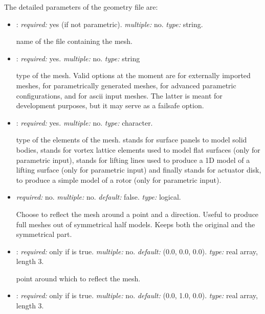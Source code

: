 The detailed parameters of the geometry file are:
\begin{itemize}
\item {}: \textit{required:} yes (if not parametric). \textit{multiple:} no. \textit{type:} string. 

name of the file containing the mesh.

\item {}: \textit{required:} yes. \textit{multiple:} no. \textit{type:} string

type of the mesh. Valid options at the moment are  for externally imported meshes,  
for parametrically generated meshes,  for advanced parametric configurations, and  for ascii input meshes. 
The latter is meant for development purposes, but it may serve as a failsafe option. 

\item {}: \textit{required:} yes. \textit{multiple:} no. \textit{type:} character.

type of the elements of the mesh.  stands for surface panels to model solid bodies, 
 stands for vortex lattice elements used to model flat surfaces (only for parametric input),  stands for 
lifting lines used to produce a 1D model of a lifting surface (only for parametric input) and 
finally  stands for actuator disk, to produce a simple model of a rotor (only for parametric input). 

\item {} \textit{required:} no. \textit{multiple:} no. \textit{default:} false. \textit{type:} logical.

Choose to reflect the mesh around a point and a direction. Useful to produce full meshes out 
of symmetrical half models. Keeps both the original and the symmetrical part. 

\item {}: \textit{required:} only if  is true. 
\textit{multiple:} no. \textit{default:} (0.0, 0.0, 0.0). \textit{type:} real array, length 3.

point around which to reflect the mesh.

\item {}: \textit{required:} only if  is true. 
\textit{multiple:} no. \textit{default:} (0.0, 1.0, 0.0). \textit{type:} real array, length 3.


\end{itemize}
